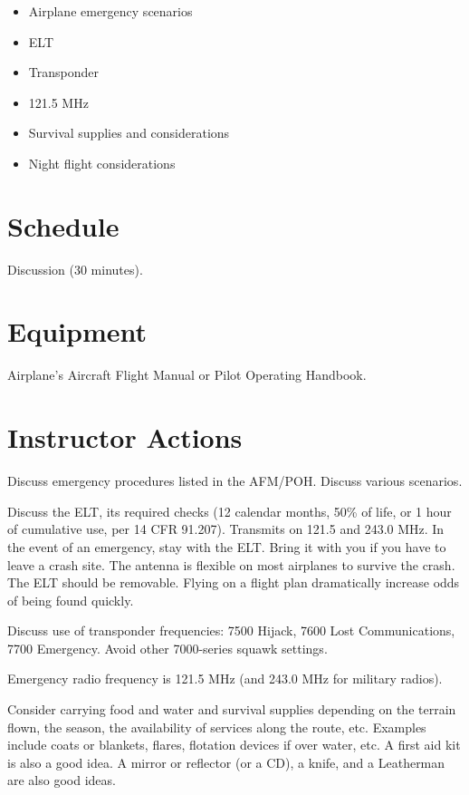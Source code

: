 \documentclass[twoside,openright]{report}
\begin{document}
\begin{itemize}
  \item Airplane emergency scenarios
  \item ELT
  \item Transponder
  \item 121.5 MHz
  \item Survival supplies and considerations
  \item Night flight considerations
\end{itemize}

\section{Schedule}

Discussion (30 minutes).

\section{Equipment}

Airplane’s Aircraft Flight Manual or Pilot Operating Handbook.

\section{Instructor Actions}

Discuss emergency procedures listed in the AFM/POH. Discuss various scenarios.

Discuss the ELT, its required checks (12 calendar months, 50\% of life, or 1
hour of cumulative use, per 14 CFR 91.207). Transmits on 121.5 and 243.0 MHz.
In the event of an emergency, stay with the ELT. Bring it with you if you have
to leave a crash site. The antenna is flexible on most airplanes to survive the
crash. The ELT should be removable. Flying on a flight plan dramatically
increase odds of being found quickly.

Discuss use of transponder frequencies: 7500 Hijack, 7600 Lost Communications,
7700 Emergency. Avoid other 7000-series squawk settings.

Emergency radio frequency is 121.5 MHz (and 243.0 MHz for military radios).

Consider carrying food and water and survival supplies depending on the terrain
flown, the season, the availability of services along the route, etc. Examples
include coats or blankets, flares, flotation devices if over water, etc. A
first aid kit is also a good idea. A mirror or reflector (or a CD), a knife,
and a Leatherman are also good ideas.
\end{document}

